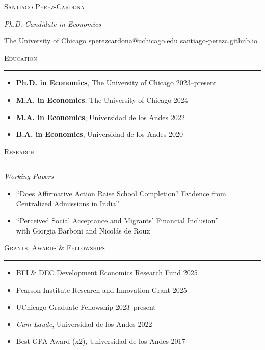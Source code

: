 \documentclass[10pt, letterpaper]{article}
\newcommand{\cvsection}[1]{%
  \vspace{14pt}%
  {\color{accent}\large\scshape #1}%
  \par\vspace{-2pt}%
  {\color{accent}\rule{\linewidth}{1.5pt}}%
  \par\vspace{6pt}%
}
\newcommand{\cvsubsection}[1]{%
  \vspace{6pt}%
  {\color{accent}\normalsize\itshape #1}%
  \par\vspace{3pt}%
}
\begin{document}
\begin{center}
  {\Huge\color{accent}\scshape Santiago Perez-Cardona}

  \vspace{10pt}

  {\large\itshape Ph.D. Candidate in Economics}

  \vspace{8pt}

  {\small\color{graytext}
  The University of Chicago
  \quad\textbar\quad
  \href{mailto:sperezcardona@uchicago.edu}{sperezcardona@uchicago.edu}
  \quad\textbar\quad
  \href{https://santiago-perezc.github.io/}{santiago-perezc.github.io}
  }
\end{center}

\cvsection{Education}

\begin{itemize}
  \item \textbf{Ph.D. in Economics}, The University of Chicago \hfill 2023--present
  \item \textbf{M.A. in Economics}, The University of Chicago \hfill 2024
  \item \textbf{M.A. in Economics}, Universidad de los Andes \hfill 2022
  \item \textbf{B.A. in Economics}, Universidad de los Andes \hfill 2020
\end{itemize}

\cvsection{Research}

\cvsubsection{Working Papers}

\begin{itemize}
  \item ``Does Affirmative Action Raise School Completion? Evidence from Centralized Admissions in India''

  \item ``Perceived Social Acceptance and Migrants' Financial Inclusion''\\
  {\small\color{graytext} with Giorgia Barboni and Nicolás de Roux}
\end{itemize}

\cvsection{Grants, Awards \& Fellowships}

\begin{itemize}
  \item BFI \& DEC Development Economics Research Fund \hfill 2025
  \item Pearson Institute Research and Innovation Grant \hfill 2025
  \item UChicago Graduate Fellowship \hfill 2023--present
  \item \textit{Cum Laude}, Universidad de los Andes \hfill 2022
  \item Best GPA Award (x2), Universidad de los Andes \hfill 2017
\end{itemize}
\end{document}
